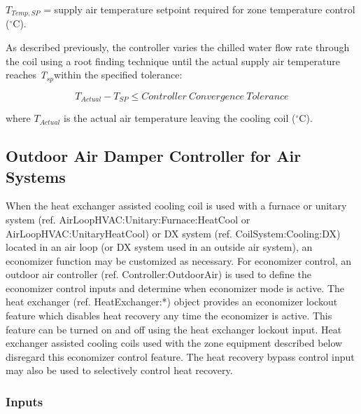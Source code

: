 \({T_{Temp,SP}}\) = supply air temperature setpoint required for zone temperature control (\(^{\circ}\)C).

As described previously, the controller varies the chilled water flow rate through the coil using a root finding technique until the actual supply air temperature reaches \emph{T\(_{sp}\)}within the specified tolerance:

\begin{equation}
{T_{Actual}} - {T_{SP}} \le Controller~Convergence~Tolerance
\end{equation}

where \({T_{Actual}}\) is the actual air temperature leaving the cooling coil (\(^{\circ}\)C).

\subsection{Outdoor Air Damper Controller for Air Systems}\label{outdoor-air-damper-controller-for-air-systems}

When the heat exchanger assisted cooling coil is used with a furnace or unitary system (ref. AirLoopHVAC:Unitary:Furnace:HeatCool or AirLoopHVAC:UnitaryHeatCool) or DX system (ref. CoilSystem:Cooling:DX) located in an air loop (or DX system used in an outside air system), an economizer function may be customized as necessary. For economizer control, an outdoor air controller (ref. Controller:OutdoorAir) is used to define the economizer control inputs and determine when economizer mode is active. The heat exchanger (ref. HeatExchanger:*) object provides an economizer lockout feature which disables heat recovery any time the economizer is active. This feature can be turned on and off using the heat exchanger lockout input. Heat exchanger assisted cooling coils used with the zone equipment described below disregard this economizer control feature. The heat recovery bypass control input may also be used to selectively control heat recovery.

\subsubsection{Inputs}\label{inputs}

